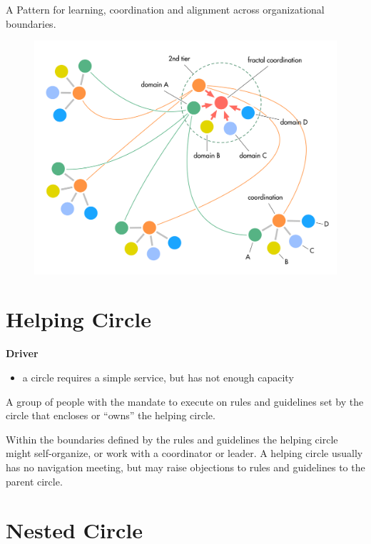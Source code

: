 A Pattern for learning, coordination and alignment across organizational boundaries.

\begin{figure}[htbp]
\centering
\includegraphics[keepaspectratio,width=\textwidth,height=0.75\textheight]{img/structural-patterns/fractal-organization.png}
\end{figure}

\section{Helping Circle}
\label{helpingcircle}

\textbf{Driver}

\begin{itemize}
\item a circle requires a simple service, but has not enough capacity

\end{itemize}

A group of people with the mandate to execute on rules and guidelines set by the circle that encloses or ``owns'' the helping circle.

Within the boundaries defined by the rules and guidelines the helping circle might self-organize, or work with a coordinator or leader. A helping circle usually has no navigation meeting, but may raise objections to rules and guidelines to the parent circle.

\section{Nested Circle}
\label{nestedcircle}

